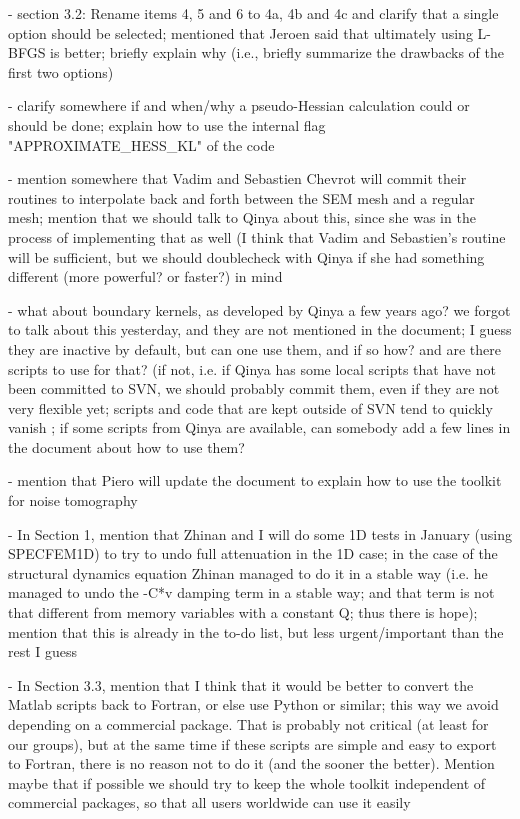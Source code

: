 \documentclass[11pt]{article}
\begin{document}
- section 3.2: Rename items 4, 5 and 6 to 4a, 4b and 4c and clarify that a single option should be selected; mentioned that Jeroen said that ultimately using L-BFGS is better; briefly explain why (i.e., briefly summarize the drawbacks of the first two options)

- clarify somewhere if and when/why a pseudo-Hessian calculation could or should be done; explain how to use the internal flag "APPROXIMATE\_HESS\_KL" of the code

- mention somewhere that Vadim and Sebastien Chevrot will commit their routines to interpolate back and forth between the SEM mesh and a regular mesh; mention that we should talk to Qinya about this, since she was in the process of implementing that as well (I think that Vadim and Sebastien's routine will be sufficient, but we should doublecheck with Qinya if she had something different (more powerful? or faster?) in mind

- what about boundary kernels, as developed by Qinya a few years ago?
we forgot to talk about this yesterday, and they are not mentioned in the document; I guess they are inactive by default, but can one use them, and if so how? and are there scripts to use for that?
(if not, i.e. if Qinya has some local scripts that have not been committed to SVN, we should probably commit them, even if they are not very flexible yet; scripts and code that are kept outside of SVN tend to quickly vanish ; if some scripts from Qinya are available, can somebody add a few lines in the document about how to use them?

- mention that Piero will update the document to explain how to use the toolkit for noise tomography

- In Section 1, mention that Zhinan and I will do some 1D tests in January (using SPECFEM1D) to try to undo full attenuation in the 1D case; in the case of the structural dynamics equation Zhinan managed to do it in a stable way (i.e. he managed to undo the -C*v damping term in a stable way; and that term is not that different from memory variables with a constant Q; thus there is hope); mention that this is already in the to-do list, but less urgent/important than the rest I guess

- In Section 3.3, mention that I think that it would be better to convert the Matlab scripts back to Fortran, or else use Python or similar; this way we avoid depending on a commercial package. That is probably not critical (at least for our groups), but at the same time if these scripts are simple and easy to export to Fortran, there is no reason not to do it (and the sooner the better). Mention maybe that if possible we should try to keep the whole toolkit independent of commercial packages, so that all users worldwide can use it easily
\end{document}
